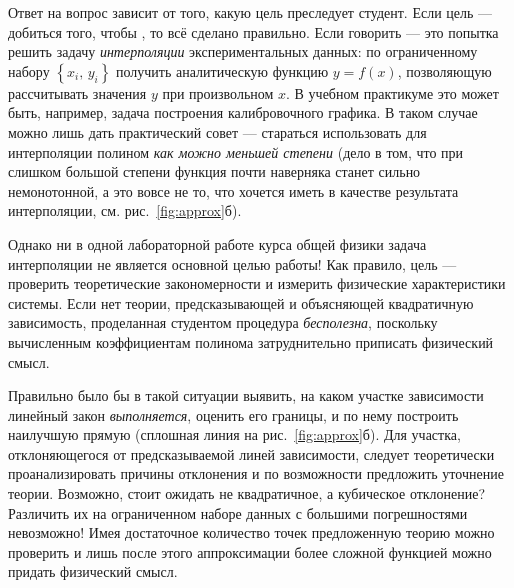 \begin{longnote}
    Ответ на вопрос зависит от того, какую цель преследует
    студент. Если цель --- добиться того, чтобы , то всё сделано правильно.
    Если говорить  ---
    это попытка решить задачу \emph{интерполяции}
    экспериментальных данных: по ограниченному набору $\left\{
x_{i},\,y_{i}\right\} $
    получить аналитическую функцию $y=f\!\left(x\right)$, позволяющую
    рассчитывать значения $y$ при произвольном $x$. В учебном практикуме
    это может быть, например, задача построения калибровочного графика.
    В таком случае можно лишь дать практический совет --- стараться
    использовать для интерполяции полином \emph{как можно
    меньшей степени} (дело в том, что при слишком большой
    степени функция почти наверняка станет сильно немонотонной, а это
    вовсе не то, что хочется иметь в качестве результата интерполяции,
    см. рис.~\ref{fig:approx}б).

    Однако ни в одной лабораторной работе курса общей
    физики задача интерполяции не является основной целью работы! Как
    правило, цель --- проверить теоретические закономерности
    и измерить физические характеристики системы. Если нет теории,
предсказывающей
    и объясняющей квадратичную зависимость, проделанная студентом процедура
    \emph{бесполезна}, поскольку вычисленным коэффициентам полинома
затруднительно
    приписать физический смысл.

    Правильно было бы в такой ситуации выявить, на каком
    участке зависимости линейный закон \emph{выполняется},
    оценить его границы, и по нему построить наилучшую прямую (сплошная
    линия на рис.~\ref{fig:approx}б). Для участка, отклоняющегося от
    предсказываемой линей зависимости, следует теоретически проанализировать
    причины отклонения и по возможности предложить уточнение теории. Возможно,
    стоит ожидать не квадратичное, а кубическое отклонение? Различить
    их на ограниченном наборе данных с большими погрешностями невозможно!
    Имея достаточное количество точек предложенную теорию можно проверить
    и лишь после этого аппроксимации более сложной функцией можно придать
    физический смысл.
\end{longnote}
